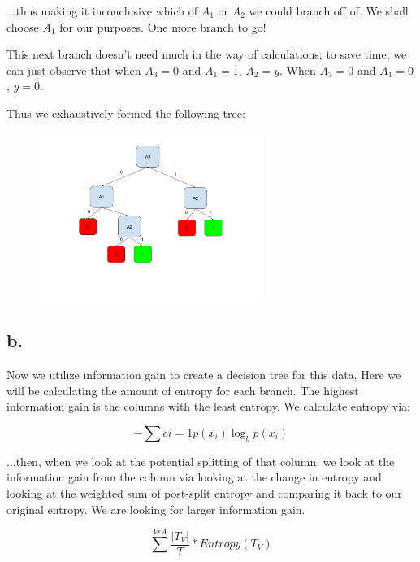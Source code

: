 \documentclass{article}
\begin{document}
\noindent ...thus making it inconclusive which of $A_1$ or $A_2$ we could branch off of. We shall choose $A_1$ for our purposes. One more branch to go!

This next branch doesn't need much in the way of calculations; to save time, we can just observe that when $A_3=0$ and $A_1=1$, $A_2=y$. When $A_3=0$ and $A_1=0$, $y=0$.

Thus we exhaustively formed the following tree:

\begin{figure}[H]
    \centering
    \includegraphics[width = 0.65\textwidth]{problem3a.png}
\end{figure}

\subsection*{b.}

Now we utilize information gain to create a decision tree for this data. Here we will be calculating the amount of entropy for each branch. The highest information gain is the columns with the least entropy. We calculate entropy via:

\begin{equation}
    -\sum{c}{i=1}p(x_i)\log_b{p(x_i)}
\end{equation}

\noindent ...then, when we look at the potential splitting of that column, we look at the information gain from the column via looking at the change in entropy and looking at the weighted sum of post-split entropy and comparing it back to our original entropy. We are looking for larger information gain.

\begin{equation}
    \sum^{V \epsilon A} \frac{\lvert T_V \rvert}{T} * Entropy(T_V)
\end{equation}
\end{document}

